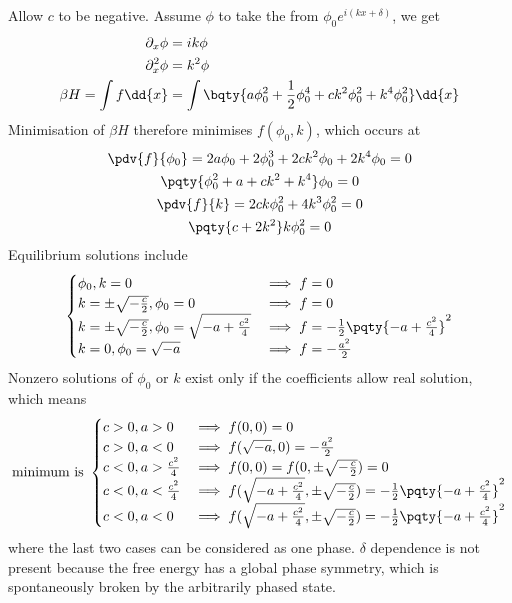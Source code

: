 \documentclass[12pt]{article}
\begin{document}
        \subsubsection{} Allow \(c\) to be negative. Assume \(\phi\) to take the from \(\phi_0 e^{i(kx + \delta)}\), we get \begin{align*}
            \partial_x \phi &= ik \phi\\
            \partial_x^2 \phi &= k^2 \phi\\
            \beta H = \int f \dd{x}&= \int\bqty{a \phi_0^2 + \frac{1}{2}\phi_0^4 + c k^2\phi_0^2 + k^4 \phi_0^2} \dd{x}
        \end{align*}
        Minimisation of \(\beta H\) therefore minimises \(f(\phi_0,k)\), which occurs at \begin{gather*}
            \pdv{f}{\phi_0} = 2a\phi_0 + 2\phi_0^3 + 2ck^2\phi_0 + 2k^4 \phi_0 =  0\\
            \pqty{\phi_0^2 + a  + ck^2 + k^4} \phi_0 =  0\\
            \pdv{f}{k} = 2ck \phi_0^2 + 4k^3 \phi_0^2 = 0\\
            \pqty{c + 2k^2}k\phi_0^2 = 0
        \end{gather*}
        Equilibrium solutions include \[
            \begin{cases}
                \phi_0, k = 0&\implies f = 0\\
                k = \pm \sqrt{ - \frac{c}{2}}, \phi_0 = 0&\implies f = 0\\
                k = \pm \sqrt{ - \frac{c}{2}}, \phi_0 = \sqrt{ - a + \frac{c^2}{4} }&\implies f =- \frac{1}{2}\pqty{ -a + \frac{c^2}{4} }^2 \\
                k = 0, \phi_0 = \sqrt{ - a}&\implies f = - \frac{a^2}{2}\\
            \end{cases}
        \]
        Nonzero solutions of \(\phi_0\) or \(k\) exist only if the coefficients allow real solution, which means \[
            \text{minimum is }\begin{cases}
                c > 0, a > 0 &\implies f(0,0) = 0\\
                c > 0, a < 0 &\implies f(\sqrt{ - a},0) = - \frac{a^2}{2}\\
                c < 0, a > \frac{c^2}{4} &\implies f(0,0) = f(0, \pm \sqrt{-\frac{c}{2}}) = 0\\
                c < 0, a < \frac{c^2}{4} &\implies f(\sqrt{ - a + \frac{c^2}{4}}, \pm \sqrt{ -\frac{c}{2}}) = - \frac{1}{2}\pqty{ - a + \frac{c^2}{4}}^2\\
                c < 0, a < 0 &\implies f(\sqrt{ - a + \frac{c^2}{4}},\pm \sqrt{ -\frac{c}{2}}) = - \frac{1}{2}\pqty{ - a + \frac{c^2}{4}}^2
            \end{cases}
        \]
        where the last two cases can be considered as one phase. \(\delta\) dependence is not present because the free energy has a global phase symmetry, which is spontaneously broken by the arbitrarily phased state.
\end{document}
